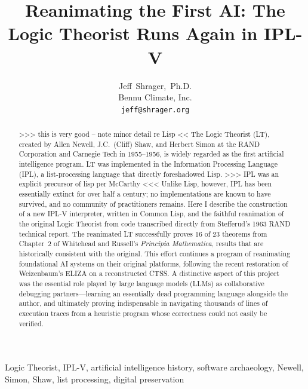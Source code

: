 \documentclass[journal]{IEEEtran}
\begin{document}
\title{Reanimating the First AI: The Logic Theorist Runs Again in IPL-V}

\author{Jeff~Shrager,~Ph.D.\\
Bennu Climate, Inc.\\
\texttt{jeff@shrager.org}}

\maketitle

\begin{abstract} >>> this is very good -- note minor detail re Lisp <<
The Logic Theorist (LT), created by Allen Newell, J.C.\ (Cliff) Shaw,
and Herbert Simon at the RAND Corporation and Carnegie Tech in
1955--1956, is widely regarded as the first artificial intelligence
program. LT was implemented in the Information Processing Language
(IPL), a list-processing language that directly foreshadowed Lisp.
>>> IPL was an explicit precursor of lisp per McCarthy <<< Unlike
Lisp, however, IPL has been essentially extinct for over half a
century; no implementations are known to have survived, and no
community of practitioners remains. Here I describe the construction
of a new IPL-V interpreter, written in Common Lisp, and the faithful
reanimation of the original Logic Theorist from code transcribed
directly from Stefferud's 1963 RAND technical report. The reanimated
LT successfully proves 16 of 23 theorems from Chapter~2 of Whitehead
and Russell's \textit{Principia Mathematica}, results that are
historically consistent with the original. This effort continues a
program of reanimating foundational AI systems on their original
platforms, following the recent restoration of Weizenbaum's ELIZA on a
reconstructed CTSS. A distinctive aspect of this project was the
essential role played by large language models (LLMs) as collaborative
debugging partners---learning an essentially dead programming language
alongside the author, and ultimately proving indispensable in
navigating thousands of lines of execution traces from a heuristic
program whose correctness could not easily be verified.
\end{abstract}

\begin{IEEEkeywords}
Logic Theorist, IPL-V, artificial intelligence history, software
archaeology, Newell, Simon, Shaw, list processing, digital preservation
\end{IEEEkeywords}

\end{document}
